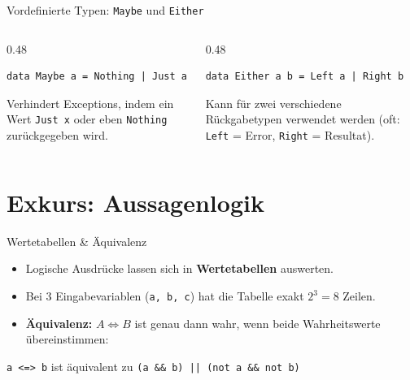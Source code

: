 \documentclass[aspectratio=169,11pt]{beamer}
\begin{document}
\begin{frame}[fragile]{Vordefinierte Typen: \texttt{Maybe} und \texttt{Either}}
    \begin{columns}[T]
        \begin{column}{0.48\textwidth}
            \begin{tcolorbox}[modernbox, title=\texttt{Maybe a}]
\begin{lstlisting}
data Maybe a = Nothing | Just a
\end{lstlisting}
            \end{tcolorbox}
            \small Verhindert Exceptions, indem ein Wert \texttt{Just x} oder eben \texttt{Nothing} zurückgegeben wird.
        \end{column}
        \begin{column}{0.48\textwidth}
            \begin{tcolorbox}[modernbox, title=\texttt{Either a b}]
\begin{lstlisting}
data Either a b = Left a | Right b
\end{lstlisting}
            \end{tcolorbox}
            \small Kann für zwei verschiedene Rückgabetypen verwendet werden (oft: \texttt{Left} = Error, \texttt{Right} = Resultat).
        \end{column}
    \end{columns}
\end{frame}

\section{Exkurs: Aussagenlogik}

\begin{frame}{Wertetabellen \& Äquivalenz}
    \begin{itemize}
        \item Logische Ausdrücke lassen sich in \textbf{Wertetabellen} auswerten.
        \item Bei 3 Eingabevariablen (\texttt{a, b, c}) hat die Tabelle exakt $2^3 = 8$ Zeilen.
        \item \textbf{Äquivalenz:} $A \Leftrightarrow B$ ist genau dann wahr, wenn beide Wahrheitswerte übereinstimmen:
    \end{itemize}
    \vspace{0.3cm}
    \begin{center}
        \texttt{a <=> b} \quad ist äquivalent zu \quad \texttt{(a \&\& b) || (not a \&\& not b)}
    \end{center}
\end{frame}
\end{document}

